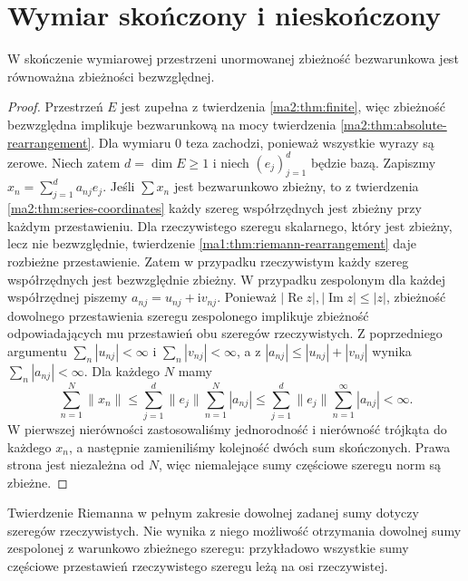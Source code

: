 \section{Wymiar skończony i nieskończony}
\begin{twierdzenie}
\label{ma2:thm:finite-unconditional-absolute}
W skończenie wymiarowej przestrzeni unormowanej
zbieżność bezwarunkowa jest równoważna zbieżności
bezwzględnej.
\end{twierdzenie}
\begin{proof}
Przestrzeń $E$ jest zupełna z twierdzenia
\ref{ma2:thm:finite}, więc zbieżność bezwzględna
implikuje bezwarunkową na mocy twierdzenia
\ref{ma2:thm:absolute-rearrangement}.
Dla wymiaru $0$ teza zachodzi, ponieważ wszystkie
wyrazy są zerowe. Niech zatem $d=\dim E\ge1$
i niech $(e_j)_{j=1}^d$ będzie bazą.
Zapiszmy $x_n=\sum_{j=1}^d a_{nj}e_j$.
Jeśli $\sum x_n$ jest bezwarunkowo zbieżny, to
z twierdzenia \ref{ma2:thm:series-coordinates}
każdy szereg współrzędnych jest zbieżny przy
każdym przestawieniu.
Dla rzeczywistego szeregu skalarnego, który jest
zbieżny, lecz nie bezwzględnie, twierdzenie
\ref{ma1:thm:riemann-rearrangement} daje rozbieżne
przestawienie. Zatem w przypadku rzeczywistym
każdy szereg współrzędnych jest bezwzględnie zbieżny.
W przypadku zespolonym dla każdej współrzędnej
piszemy $a_{nj}=u_{nj}+\mathrm i v_{nj}$.
Ponieważ $|\operatorname{Re}z|,|\operatorname{Im}z|\le |z|$,
zbieżność dowolnego przestawienia szeregu zespolonego
implikuje zbieżność odpowiadających mu przestawień obu
szeregów rzeczywistych. Z poprzedniego argumentu
$\sum_n|u_{nj}|<\infty$ i $\sum_n|v_{nj}|<\infty$,
a z $|a_{nj}|\le|u_{nj}|+|v_{nj}|$ wynika
$\sum_n|a_{nj}|<\infty$. Dla każdego $N$ mamy
\[
 \sum_{n=1}^N\|x_n\|
 \le \sum_{j=1}^d\|e_j\|\sum_{n=1}^N|a_{nj}|
 \le \sum_{j=1}^d\|e_j\|\sum_{n=1}^\infty|a_{nj}|<\infty.
\]
W pierwszej nierówności zastosowaliśmy jednorodność
i nierówność trójkąta do każdego $x_n$, a następnie
zamieniliśmy kolejność dwóch sum skończonych.
Prawa strona jest niezależna od $N$, więc niemalejące
sumy częściowe szeregu norm są zbieżne.
\end{proof}
Twierdzenie Riemanna w pełnym zakresie dowolnej
zadanej sumy dotyczy szeregów rzeczywistych.
Nie wynika z niego możliwość otrzymania dowolnej
sumy zespolonej z warunkowo zbieżnego szeregu:
przykładowo wszystkie sumy częściowe przestawień
rzeczywistego szeregu leżą na osi rzeczywistej.

